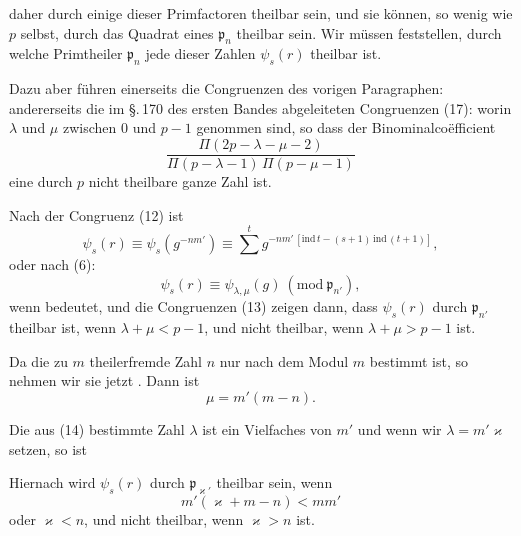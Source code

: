 daher durch einige dieser Primfactoren theilbar sein, und sie können, so wenig wie $p$ selbst, durch das Quadrat eines $\mathfrak{p}_n$ theilbar sein. Wir müssen feststellen, durch welche Primtheiler $\mathfrak{p}_n$ jede dieser Zahlen $\psi_s(r)$ theilbar ist.

Dazu aber führen einerseits die Congruenzen des vorigen Paragraphen:
andererseits die im \S.\,170 des ersten Bandes abgeleiteten Congruenzen (17):
worin $\lambda$ und $\mu$ zwischen $0$ und $p-1$ genommen sind, so dass der Binominalcoëfficient %
\[
\frac{\Pi(2p-\lambda-\mu-2)}{\Pi(p-\lambda-1)\,\Pi(p-\mu-1)}
\]
eine durch $p$ nicht theilbare ganze Zahl ist.

Nach der Congruenz (12) ist
\[
\psi_s(r) \equiv \psi_s(g^{-nm'}) \equiv \sum\limits^{t} g^{-nm'\,[\mathrm{ind}\,t - (s+1)\,\mathrm{ind}\,(t+1)]},
\]
oder nach (6):
\[
\psi_s(r) \equiv \psi_{\lambda,\mu}(g) \ (\mathrm{mod}\ \mathfrak{p}_{n'}),
\]
wenn
bedeutet, und die Congruenzen (13) zeigen dann, dass $\psi_s(r)$ durch $\mathfrak{p}_{n'}$ theilbar ist, wenn $\lambda+\mu<p-1$, und nicht theilbar, wenn $\lambda+\mu>p-1$ ist.

Da die zu $m$ theilerfremde Zahl $n$ nur nach dem Modul $m$ bestimmt ist, so nehmen wir sie jetzt . Dann ist
\[
\mu = m'(m-n).
\]

Die aus (14) bestimmte Zahl $\lambda$ ist ein Vielfaches von $m'$ und wenn wir $\lambda = m'\varkappa$ setzen, so ist

Hiernach wird $\psi_s(r)$ durch $\mathfrak{p}_{\varkappa'}$ theilbar sein, wenn
\[
m'(\varkappa+m-n) < m m'
\]
oder $\varkappa < n$, und nicht theilbar, wenn $\varkappa > n$ ist.
